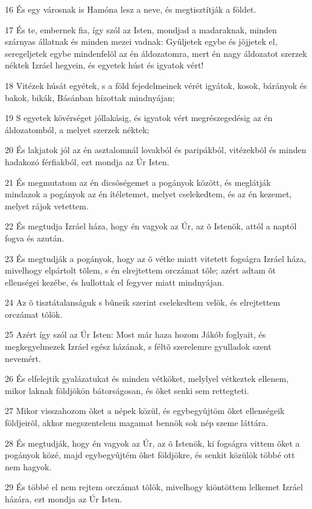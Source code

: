 \par 16 És egy városnak is Hamóna lesz a neve, és megtisztítják a földet.
\par 17 És te, embernek fia, így szól az Isten, mondjad a madaraknak, minden szárnyas állatnak és minden mezei vadnak: Gyûljetek egybe és jõjjetek el, seregeljetek egybe mindenfelõl az én áldozatomra, mert én nagy áldozatot szerzek néktek Izráel hegyein, és egyetek húst és igyatok vért!
\par 18 Vitézek húsát egyétek, s a föld fejedelmeinek vérét igyátok, kosok, bárányok és bakok, bikák, Básánban hízottak mindnyájan;
\par 19 S egyetek kövérséget jóllakásig, és igyatok vért megrészegedésig az én áldozatomból, a melyet szerzek néktek;
\par 20 És lakjatok jól az én asztalomnál lovakból és paripákból, vitézekbõl és minden hadakozó férfiakból, ezt mondja az Úr Isten.
\par 21 És megmutatom az én dicsõségemet a pogányok között, és meglátják mindazok a pogányok az én ítéletemet, melyet cselekedtem, és az én kezemet, melyet rájok vetettem.
\par 22 És megtudja Izráel háza, hogy én vagyok az Úr, az õ Istenök, attól a naptól fogva és azután.
\par 23 És megtudják a pogányok, hogy az õ vétke miatt vitetett fogságra Izráel háza, mivelhogy elpártolt tõlem, s én elrejtettem orczámat tõle; azért adtam õt ellenségei kezébe, és hullottak el fegyver miatt mindnyájan.
\par 24 Az õ tisztátalanságuk s bûneik szerint cselekedtem velök, és elrejtettem orczámat tõlök.
\par 25 Azért így szól az Úr Isten: Most már haza hozom Jákób foglyait, és megkegyelmezek Izráel egész házának, s féltõ szerelemre gyulladok szent nevemért.
\par 26 És elfelejtik gyalázatukat és minden vétköket, melylyel vétkeztek ellenem, mikor laknak földjökön bátorságosan, és õket senki sem rettegteti.
\par 27 Mikor visszahozom õket a népek közül, és egybegyûjtöm õket ellenségeik földjeirõl, akkor megszentelem magamat bennök sok nép szeme láttára.
\par 28 És megtudják, hogy én vagyok az Úr, az õ Istenök, ki fogságra vittem õket a pogányok közé, majd egybegyûjtém õket földjökre, és senkit közülök többé ott nem hagyok.
\par 29 És többé el nem rejtem orczámat tõlök, mivelhogy kiöntöttem lelkemet Izráel házára, ezt mondja az Úr Isten.

